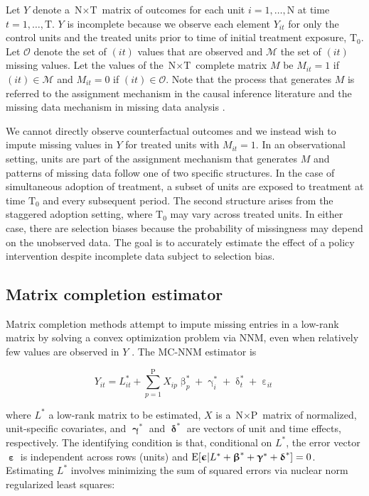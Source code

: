 Let $Y$ denote a $\text{N} \times \text{T}$ matrix of outcomes for each unit $i =1, \ldots, \text{N}$ at time $t = 1, \ldots, \text{T}$. $Y$ is incomplete because we observe each element $Y_{it}$ for only the control units and the treated units prior to time of initial treatment exposure, $\text{T}_0$. Let $\mathcal{O}$ denote the set of $(it)$ values that are observed and $\mathcal{M}$ the set of $(it)$ missing values. Let the values of the $\text{N} \times \text{T}$ complete matrix $M$ be $M_{it} =1 $ if $(it) \in \mathcal{M}$ and $M_{it} = 0$ if $(it) \in \mathcal{O}$. Note that the process that generates $M$ is referred to the assignment mechanism in the causal inference literature \citep{imbens2015causal} and the missing data mechanism in missing data analysis \citep{little2014}.

We cannot directly observe counterfactual outcomes and we instead wish to impute missing values in $Y$ for treated units with $M_{it}=1$. In an observational setting, units are part of the assignment mechanism that generates $M$ and patterns of missing data follow one of two specific structures. In the case of simultaneous adoption of treatment, a subset of units are exposed to treatment at time $\text{T}_0$ and every subsequent period. The second structure arises from the staggered adoption setting, where $\text{T}_0$ may vary across treated units. In either case, there are selection biases because the probability of missingness may depend on the unobserved data. The goal is to accurately estimate the effect of a policy intervention despite incomplete data subject to selection bias. 

\subsection{Matrix completion estimator}

Matrix completion methods attempt to impute missing entries in a low-rank matrix by solving a convex optimization problem via NNM, even when relatively few values are observed in $Y$ \citep{candes2009exact,candes2010matrix}. The MC-NNM estimator is 

\begin{equation}
Y_{it} = L_{it}^{*} + \sum_{p=1}^{\text{P}} X_{ip} \upbeta_{p}^{*} + \upgamma_{i}^{*} + \updelta_{t}^{*} + \upepsilon_{it} \label{eq:mc-Y}
\end{equation}

\noindent
where $L^{*}$ a low-rank matrix to be estimated, $X$ is a $\text{N} \times \text{P}$ matrix of normalized, unit-specific covariates, and $\boldsymbol{\upgamma}^{*}$ and $\boldsymbol{\updelta}^{*}$ are vectors of unit and time effects, respectively. The identifying condition is that, conditional on $L^{*}$, the error vector $\boldsymbol{\upepsilon}$ is independent across rows (units) and $\mathrm{E}[\boldsymbol{\upepsilon} | L^{*} + \boldsymbol{\upbeta}^{*} + \boldsymbol{\upgamma}^{*} + \boldsymbol{\updelta}^{*}] = 0$. Estimating $L^{*}$ involves minimizing the sum of squared errors via nuclear norm regularized least squares:

